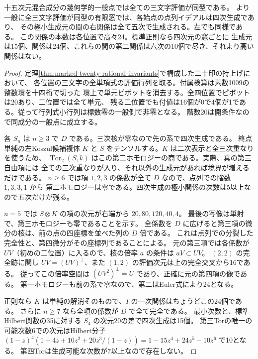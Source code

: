 \begin{corollary}\label{cor:finite-full-triple-regular-presentation}
十五次元混合成分の幾何学的一般点では全ての三文字評価が同型である。
より一般に全三文字評価が同型の有限窓では、各始点の点列イデアルは四次生成であり、
その極小生成元の間の右関係は全て五次で生成される。左でも同様である。
この関係の本数は各位置で高々24。標準正則なら四次元の窓ごとに
生成元は15個、関係は24個、これらの間の第二関係は六次の10個で尽き、それより高い関係はない。
\end{corollary}
\begin{proof}
定理\ref{thm:marked-twenty-rational-invariants}で構成した二十印の持上げにおいて、
各位置の三文字の全単項式の評価行列を取る。付属検算は素数1009の整数環を十四桁で切った
環上で単元ピボットを消去する。全四位置でピボットは20あり、二位置では全て単元、
残る二位置でも付値は16個が0で4個が1である。従って行列式小行列は標数零の一般側で非零となる。
階数20は開条件なので同成分の一般点に成立する。

各 $S_n$ は $n\ge3$ で $D$ である。三次核が零なので先の系で四次生成である。
終点単純の左Koszul候補複体 $K$ と $S$ をテンソルする。$K$ は二次表示と全三次重なりを使うため、
$\operatorname{Tor}_2(S,k)$ はこの第二ホモロジーの商である。実際、真の第三自由項には
全ての三次重なりが入り、それ以外の生成元があれば境界が増えるだけである。
$n\ge6$ では項 $1,2,3$ の係数が全て $D$ なので、点列での階数 $1,3,3,1$ から
第二ホモロジーは零である。四次生成の極小関係の次数は5以上なので五次だけが残る。

$n=5$ では $S\otimes K$ の項の次元が右端から $20,80,120,40,4$。
最後の写像は単射で、第三ホモロジーも零であることを示す。
全係数を $D$ に広げると第三項の微分の核は、前の点の四座標を並べた列の $D$ 倍である。
これは点列での分裂した完全性と、第四微分がその座標列であることによる。
元の第三項では各係数が $UV$（初めの二位置）に入るので、核の倍率 $a$ の条件は $aV\subset UV$。
$(2,2)$ の完全跡に関し $UV=(UV)^\perp$、また $(1,2)$ の評価次元は上の完全交叉から16である。
従ってこの倍率空間は $(UV^2)^\perp=U$ であり、正確に元の第四項の像である。
第一ホモロジーも前の系で零なので、第二はEuler式により24となる。

正則なら $K$ は単純の解消そのもので、$I$ の一次関係はちょうどこの24個である。
さらに $n\ge7$ なら全項の係数が $D$ で全て完全である。
最小次数と、標準Hilbert関数の35に対する $S_4$ の次元20の差で四次生成は15個。
第三Torの唯一の可能次数6での次元はHilbert分子
$(1-z)^4(1+4z+10z^2+20z^3/(1-z))=1-15z^4+24z^5-10z^6$ で10となる。
第四Torは生成可能な次数が7以上なので存在しない。
\end{proof}
